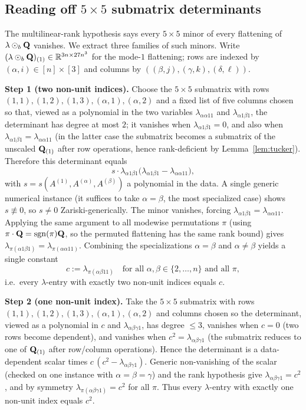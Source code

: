 \documentclass[11pt]{article}
\begin{document}
\subsection*{Reading off $5\times5$ submatrix determinants}

The multilinear-rank hypothesis says every $5\times5$ minor of every flattening
of $\lambda\odot_b\mathbf{Q}$ vanishes. We extract three families of such minors. Write
$(\lambda\odot_b\mathbf{Q})_{(1)}\in\mathbb{R}^{3n\times27n^3}$ for the mode-$1$ flattening;
rows are indexed by $(\alpha,i)\in[n]\times[3]$ and columns by
$((\beta,j),(\gamma,k),(\delta,\ell))$.

\medskip
\noindent\textbf{Step 1 (two non-unit indices).}
Choose the $5\times5$ submatrix with rows $(1,1),(1,2),(1,3),(\alpha,1),(\alpha,2)$
and a fixed list of five columns chosen so that, viewed as a polynomial in the
two variables $\lambda_{\alpha\alpha11}$ and $\lambda_{\alpha1\beta1}$, the
determinant has degree at most $2$; it vanishes when $\lambda_{\alpha1\beta1}=0$,
and also when $\lambda_{\alpha1\beta1}=\lambda_{\alpha\alpha11}$ (in the latter
case the submatrix becomes a submatrix of the unscaled $\mathbf{Q}_{(1)}$ after row
operations, hence rank-deficient by Lemma~\ref{lem:tucker}). Therefore this
determinant equals
\[
  s\cdot\lambda_{\alpha1\beta1}\bigl(\lambda_{\alpha1\beta1}-\lambda_{\alpha\alpha11}\bigr),
\]
with $s=s(A^{(1)},A^{(\alpha)},A^{(\beta)})$ a polynomial in the data. A single
generic numerical instance (it suffices to take $\alpha=\beta$, the most
specialized case) shows $s\not\equiv0$, so $s\ne0$ Zariski-generically. The
minor vanishes, forcing $\lambda_{\alpha1\beta1}=\lambda_{\alpha\alpha11}$.
Applying the same argument to all modewise permutations $\pi$ (using
$\pi\cdot\mathbf{Q}=\operatorname{sgn}(\pi)\mathbf{Q}$, so the permuted flattening has the same rank bound)
gives $\lambda_{\pi(\alpha1\beta1)}=\lambda_{\pi(\alpha\alpha11)}$. Combining the
specializations $\alpha=\beta$ and $\alpha\ne\beta$ yields a single constant
\[
  c:=\lambda_{\pi(\alpha\beta11)}\quad\text{for all }\alpha,\beta\in\{2,\dots,n\}\text{ and all }\pi,
\]
i.e.\ every $\lambda$-entry with exactly two non-unit indices equals $c$.

\medskip
\noindent\textbf{Step 2 (one non-unit index).}
Take the $5\times5$ submatrix with rows $(1,1),(1,2),(1,3),(\alpha,1),(\alpha,2)$
and columns chosen so the determinant, viewed as a polynomial in $c$ and
$\lambda_{\alpha\beta\gamma1}$, has degree $\le3$, vanishes when $c=0$ (two rows
become dependent), and vanishes when $c^{2}=\lambda_{\alpha\beta\gamma1}$ (the
submatrix reduces to one of $\mathbf{Q}_{(1)}$ after row/column operations). Hence the
determinant is a data-dependent scalar times $c\,(c^{2}-\lambda_{\alpha\beta\gamma1})$.
Generic non-vanishing of the scalar (checked on one instance with
$\alpha=\beta=\gamma$) and the rank hypothesis give
$\lambda_{\alpha\beta\gamma1}=c^{2}$, and by symmetry
$\lambda_{\pi(\alpha\beta\gamma1)}=c^{2}$ for all $\pi$. Thus every $\lambda$-entry
with exactly one non-unit index equals $c^{2}$.
\end{document}
